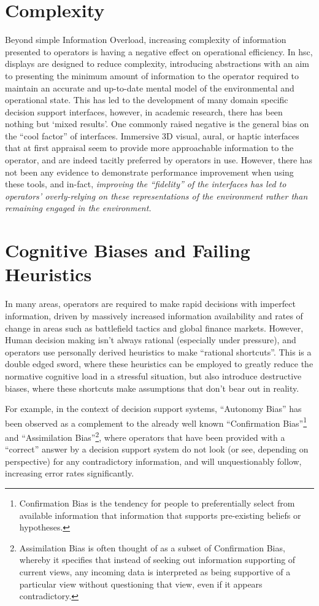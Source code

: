 \section{Complexity}
Beyond simple Information Overload, increasing complexity of information presented to operators is having a negative effect on operational efficiency.
In \gls{hsc}, displays are designed to reduce complexity, introducing abstractions with an aim to presenting the minimum amount of information to the operator required to maintain an accurate and up-to-date mental model of the environmental and operational state.
This has led to the development of many domain specific decision support interfaces, however, in academic research, there has been nothing but ‘mixed results’.
One commonly raised negative is the general bias on the ``cool factor'' of interfaces.
Immersive 3D visual, aural, or haptic interfaces that at first appraisal seem to provide more approachable information to the operator, and are indeed tacitly preferred by operators in use.
However, there has not been any evidence to demonstrate performance improvement when using these tools, and in-fact, \textit{improving the ``fidelity'' of the interfaces has led to operators’ overly-relying on these representations of the environment rather than remaining engaged in the environment.}

\section{Cognitive Biases and Failing Heuristics}
In many areas, operators are required to make rapid decisions with imperfect information, driven by massively increased information availability and rates of change in areas such as battlefield tactics and global finance markets.
However, Human decision making isn’t always rational (especially under pressure), and operators use personally derived heuristics to make ``rational shortcuts''.
This is a double edged sword, where these heuristics can be employed to greatly reduce the normative cognitive load in a stressful situation, but also introduce destructive biases, where these shortcuts make assumptions that don’t bear out in reality.

For example, in the context of decision support systems, ``Autonomy Bias'' has been observed as a complement to the already well known ``Confirmation Bias''\footnote{Confirmation Bias is the tendency for people to preferentially select from available information that information that supports pre-existing beliefs or hypotheses.}  and ``Assimilation Bias''\footnote{Assimilation Bias is often thought of as a subset of Confirmation Bias, whereby it specifies that instead of seeking out information supporting of current views, any incoming data is interpreted as being supportive of a particular view without questioning that view, even if it appears contradictory.}, where operators that have been provided with a ``correct'' answer by a decision support system do not look (or see, depending on perspective) for any contradictory information, and will unquestionably follow, increasing error rates significantly.

